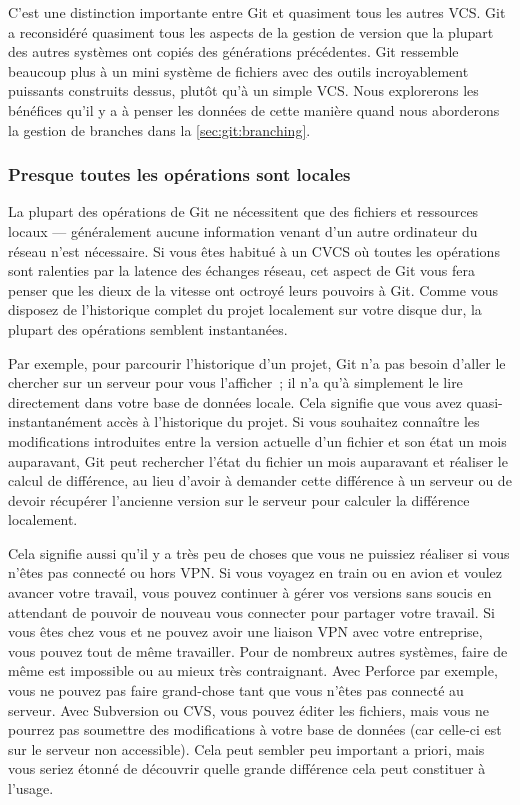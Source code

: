C'est une distinction importante entre Git et quasiment tous les autres VCS.
Git a reconsidéré quasiment tous les aspects de la gestion de version que la plupart des autres systèmes ont copiés des générations précédentes.
Git ressemble beaucoup plus à un mini système de fichiers avec des outils incroyablement puissants construits dessus, plutôt qu'à un simple VCS.
Nous explorerons les bénéfices qu'il y a à penser les données de cette manière quand nous aborderons la gestion de branches dans la \autoref{sec:git:branching}.

\subsubsection{Presque toutes les opérations sont locales}

La plupart des opérations de Git ne nécessitent que des fichiers et ressources locaux  --- généralement aucune information venant d'un autre ordinateur du réseau n'est nécessaire.
Si vous êtes habitué à un CVCS où toutes les opérations sont ralenties par la latence des échanges réseau, cet aspect de Git vous fera penser que les dieux de la vitesse ont octroyé leurs pouvoirs à Git.
Comme vous disposez de l'historique complet du projet localement sur votre disque dur, la plupart des opérations semblent instantanées.

Par exemple, pour parcourir l'historique d'un projet, Git n'a pas besoin d'aller le chercher sur un serveur pour vous l'afficher ;
il n'a qu'à simplement le lire directement dans votre base de données locale.
Cela signifie que vous avez quasi-instantanément accès à l'historique du projet.
Si vous souhaitez connaître les modifications introduites entre la version actuelle d'un fichier et son état un mois auparavant, Git peut rechercher l'état du fichier un mois auparavant et réaliser le calcul de différence, au lieu d'avoir à demander cette différence à un serveur ou de devoir récupérer l'ancienne version sur le serveur pour calculer la différence localement.

Cela signifie aussi qu'il y a très peu de choses que vous ne puissiez réaliser si vous n'êtes pas connecté ou hors VPN.
Si vous voyagez en train ou en avion et voulez avancer votre travail, vous pouvez continuer à gérer vos versions sans soucis en attendant de pouvoir de nouveau vous connecter pour partager votre travail.
Si vous êtes chez vous et ne pouvez avoir une liaison VPN avec votre entreprise, vous pouvez tout de même travailler.
Pour de nombreux autres systèmes, faire de même est impossible ou au mieux très contraignant.
Avec Perforce par exemple, vous ne pouvez pas faire grand-chose tant que vous n'êtes pas connecté au serveur.
Avec Subversion ou CVS, vous pouvez éditer les fichiers, mais vous ne pourrez pas soumettre des modifications à votre base de données (car celle-ci est sur le serveur non accessible).
Cela peut sembler peu important a priori, mais vous seriez étonné de découvrir quelle grande différence cela peut constituer à l'usage.

